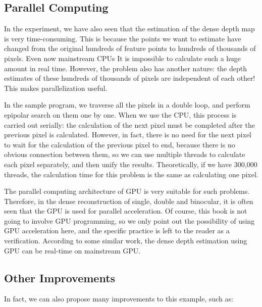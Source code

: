 \subsection{Parallel Computing}
In the experiment, we have also seen that the estimation of the dense depth map is very time-consuming. This is because the points we want to estimate have changed from the original hundreds of feature points to hundreds of thousands of pixels. Even now mainstream CPUs It is impossible to calculate such a huge amount in real time. However, the problem also has another nature: the depth estimates of these hundreds of thousands of pixels are independent of each other! This makes parallelization useful.

In the sample program, we traverse all the pixels in a double loop, and perform epipolar search on them one by one. When we use the CPU, this process is carried out serially: the calculation of the next pixel must be completed after the previous pixel is calculated. However, in fact, there is no need for the next pixel to wait for the calculation of the previous pixel to end, because there is no obvious connection between them, so we can use multiple threads to calculate each pixel separately, and then unify the results. Theoretically, if we have 300,000 threads, the calculation time for this problem is the same as calculating one pixel.

The parallel computing architecture of GPU is very suitable for such problems. Therefore, in the dense reconstruction of single, double and binocular, it is often seen that the GPU is used for parallel acceleration. Of course, this book is not going to involve GPU programming, so we only point out the possibility of using GPU acceleration here, and the specific practice is left to the reader as a verification. According to some similar work, the dense depth estimation using GPU can be real-time on mainstream GPU.

\subsection{Other Improvements}
In fact, we can also propose many improvements to this example, such as:


